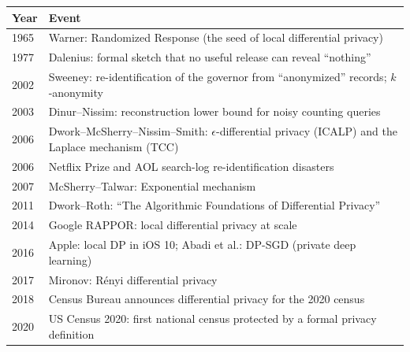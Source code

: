 \begin{tabularx}{\linewidth}{|l|X|}
\hline
\textbf{Year} & \textbf{Event} \\ \hline
1965 & Warner: Randomized Response (the seed of local differential privacy) \\ \hline
1977 & Dalenius: formal sketch that no useful release can reveal ``nothing'' \\ \hline
2002 & Sweeney: re-identification of the governor from ``anonymized'' records; $k$-anonymity \\ \hline
2003 & Dinur--Nissim: reconstruction lower bound for noisy counting queries \\ \hline
2006 & Dwork--McSherry--Nissim--Smith: $\epsilon$-differential privacy (ICALP) and the Laplace mechanism (TCC) \\ \hline
2006 & Netflix Prize and AOL search-log re-identification disasters \\ \hline
2007 & McSherry--Talwar: Exponential mechanism \\ \hline
2011 & Dwork--Roth: ``The Algorithmic Foundations of Differential Privacy'' \\ \hline
2014 & Google RAPPOR: local differential privacy at scale \\ \hline
2016 & Apple: local DP in iOS 10; Abadi et al.: DP-SGD (private deep learning) \\ \hline
2017 & Mironov: R\'enyi differential privacy \\ \hline
2018 & Census Bureau announces differential privacy for the 2020 census \\ \hline
2020 & US Census 2020: first national census protected by a formal privacy definition \\ \hline
\end{tabularx}


